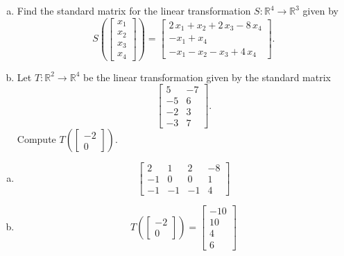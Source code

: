
\begin{exerciseStatement}

\begin{enumerate}[(a)]
\item Find the standard matrix for the linear transformation \(S:\mathbb{R}^ 4  \to \mathbb{R}^ 3 \) given by \[S\left(  \left[\begin{array}{c}
x_{1} \\
x_{2} \\
x_{3} \\
x_{4}
\end{array}\right]  \right) =  \left[\begin{array}{c}
2 \, x_{1} + x_{2} + 2 \, x_{3} - 8 \, x_{4} \\
-x_{1} + x_{4} \\
-x_{1} - x_{2} - x_{3} + 4 \, x_{4}
\end{array}\right] .\]
\item Let \(T:\mathbb{R}^ 2  \to \mathbb{R}^ 4 \) be the linear transformation given by the standard matrix \[ \left[\begin{array}{cc}
5 & -7 \\
-5 & 6 \\
-2 & 3 \\
-3 & 7
\end{array}\right] .\] Compute \(T\left( \left[\begin{array}{c}
-2 \\
0
\end{array}\right]  \right)\). 
\end{enumerate}
    
\end{exerciseStatement}
    
\begin{exerciseAnswer} 

\begin{enumerate}[(a)]
\item \[ \left[\begin{array}{cccc}
2 & 1 & 2 & -8 \\
-1 & 0 & 0 & 1 \\
-1 & -1 & -1 & 4
\end{array}\right] \]
\item \[T\left( \left[\begin{array}{c}
-2 \\
0
\end{array}\right]  \right)= \left[\begin{array}{c}
-10 \\
10 \\
4 \\
6
\end{array}\right] \]
\end{enumerate}
    
\end{exerciseAnswer}
    
